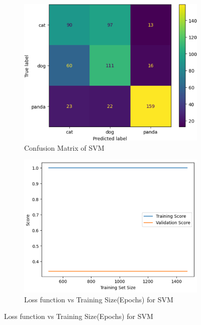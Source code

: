 \begin{figure}[h]
    \label{fig:figure7}
    \begin{subfigure}{0.4\textwidth}
        \centering
        \includegraphics[scale=0.5]{csvm_cfm}
        \caption{Confusion Matrix of SVM}
        \label{fig:figure7a}
    \end{subfigure}
    \hspace{0.2\textwidth}
	\begin{subfigure}{0.4\textwidth}
        \centering
        \includegraphics[scale=0.5]{svm_overfit}
        \caption{Loss function vs Training Size(Epochs) for SVM}
        \label{fig:figure7b}
    \end{subfigure}
\end{figure}

